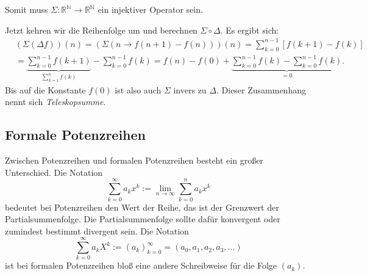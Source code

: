 \documentclass[a4paper,11pt,fleqn,twoside]{scrartcl}
\numberwithin{equation}{section}
\newcommand{\N}{\mathbb N}
\newcommand{\R}{\mathbb R}
\theoremstyle{rmbox}
\begin{document}
Somit muss $\Sigma\colon\R^\N\to\R^\N$ ein injektiver Operator
sein.

Jetzt kehren wir die Reihenfolge um und berechnen $\Sigma\circ\Delta$.
Es ergibt sich:
\begin{align}
&(\Sigma(\Delta f))(n) = (\Sigma(n\to f(n+1)-f(n)))(n)
= \sum_{k=0}^{n-1} [f(k+1)-f(k)]\\
&= \underbrace{\sum_{k=0}^{n-1} f(k+1)}_{\sum_{k=1}^n f(k)}
- \sum_{k=0}^{n-1} f(k)
= f(n)-f(0) + \underbrace{\sum_{k=0}^{n-1} f(k)
- \sum_{k=0}^{n-1} f(k)}_{=0}.
\end{align}
Bis auf die Konstante $f(0)$ ist also auch $\Sigma$ invers zu $\Delta$.
Dieser Zusammenhang nennt sich \emph{Teleskopsumme}.

\subsection{Formale Potenzreihen}
Zwischen Potenzreihen und formalen Potenzreihen besteht
ein großer Unterschied. Die Notation
\begin{equation}
\sum_{k=0}^\infty a_k x^k := \lim_{n\to\infty}\sum_{k=0}^n a_k x^k
\end{equation}
bedeutet bei Potenzreihen den Wert der Reihe, das ist der
Grenzwert der Partialsummenfolge. Die Partialsummenfolge sollte
dafür konvergent oder zumindest bestimmt divergent sein.
Die Notation
\begin{equation}
\sum_{k=0}^\infty a_k X^k := (a_k)_{k=0}^\infty = (a_0,a_1,a_2,a_3,\ldots)
\end{equation}
ist bei formalen Potenzreihen bloß eine andere
Schreibweise für die Folge $(a_k)$.
\end{document}
